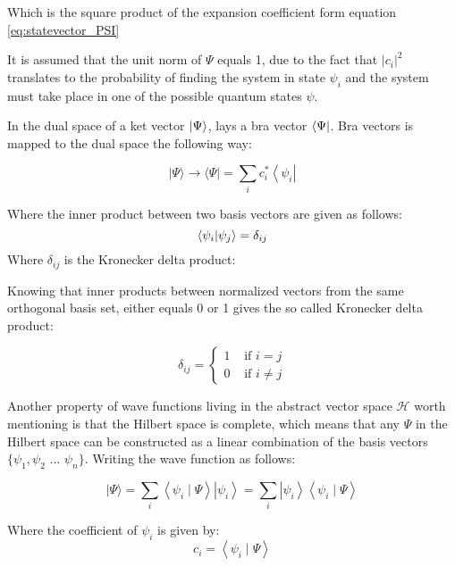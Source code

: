 \documentclass[../main.tex]{subfiles}
\begin{document}
Which is the square product of the expansion coefficient form equation \autoref{eq:statevector_PSI}

It is assumed that the unit norm of $\Psi$ equals 1, due to the fact that $|c_i|^2$ translates to the probability of finding the system in state $\psi_i$ and the system must take place in one of the possible quantum states $\psi$. 

In the dual space of a ket vector $\ket{\Psi}$, lays a bra vector $\bra{\Psi}$. Bra vectors is mapped to the dual space the following way:

\begin{equation*}
|\Psi\rangle \rightarrow\langle\Psi|=\sum_{i} c_{i}^{*}\left\langle\psi_{i}\right|
\end{equation*}

Where the inner product between two basis vectors are given as follows:
\begin{equation*}
    \bra{\psi_i}\ket{\psi_j}=\delta_{ij}
\end{equation*}
Where $\delta_{ij}$ is the Kronecker delta product:

Knowing that inner products between normalized vectors from the same orthogonal basis set, either equals 0 or 1 gives the so called Kronecker delta product:

\begin{equation*}
    \delta_{i j}= \begin{cases}1 & \text { if } i=j \\ 0 & \text { if } i \neq j\end{cases}
\end{equation*}

Another property of wave functions living in the abstract vector space $\mathcal{H}$ worth mentioning is that the Hilbert space is complete, which means that any $\Psi$ in the Hilbert space can be constructed as a linear combination of the basis vectors $\{\psi_1, \psi_2$ ... $\psi_n\}$. Writing the wave function as follows:

\begin{equation*}
    |\Psi\rangle=\sum_{i}\left\langle\psi_{i} \mid \Psi\right\rangle\left|\psi_{i}\right\rangle=\sum_{i}\left|\psi_{i}\right\rangle\left\langle\psi_{i} \mid \Psi\right\rangle
\end{equation*}

Where the coefficient of $\psi_i$ is given by:
\begin{equation*}
    c_i=\left\langle\psi_{i} \mid \Psi\right\rangle
\end{equation*}
\end{document}
